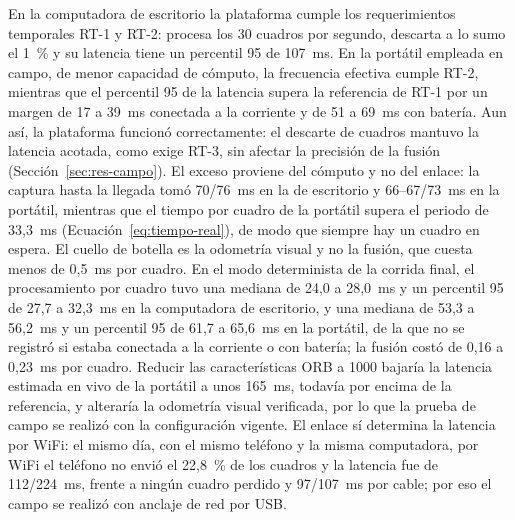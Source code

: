 En la computadora de escritorio la plataforma cumple los requerimientos temporales RT-1 y RT-2: procesa los 30 cuadros por segundo, descarta a lo sumo el 1~\% y su latencia tiene un percentil 95 de 107~ms.
En la portátil empleada en campo, de menor capacidad de cómputo, la frecuencia efectiva cumple RT-2, mientras que el percentil 95 de la latencia supera la referencia de RT-1 por un margen de 17 a 39~ms conectada a la corriente y de 51 a 69~ms con batería.
Aun así, la plataforma funcionó correctamente: el descarte de cuadros mantuvo la latencia acotada, como exige RT-3, sin afectar la precisión de la fusión (Sección~\ref{sec:res-campo}).
El exceso proviene del cómputo y no del enlace: la captura hasta la llegada tomó 70/76~ms en la de escritorio y 66--67/73~ms en la portátil, mientras que el tiempo por cuadro de la portátil supera el periodo de 33,3~ms (Ecuación~\eqref{eq:tiempo-real}), de modo que siempre hay un cuadro en espera.
El cuello de botella es la odometría visual y no la fusión, que cuesta menos de 0,5~ms por cuadro.
En el modo determinista de la corrida final, el procesamiento por cuadro tuvo una mediana de 24,0 a 28,0~ms y un percentil 95 de 27,7 a 32,3~ms en la computadora de escritorio, y una mediana de 53,3 a 56,2~ms y un percentil 95 de 61,7 a 65,6~ms en la portátil, de la que no se registró si estaba conectada a la corriente o con batería; la fusión costó de 0,16 a 0,23~ms por cuadro.
Reducir las características ORB a 1000 bajaría la latencia estimada en vivo de la portátil a unos 165~ms, todavía por encima de la referencia, y alteraría la odometría visual verificada, por lo que la prueba de campo se realizó con la configuración vigente.
El enlace sí determina la latencia por WiFi: el mismo día, con el mismo teléfono y la misma computadora, por WiFi el teléfono no envió el 22,8~\% de los cuadros y la latencia fue de 112/224~ms, frente a ningún cuadro perdido y 97/107~ms por cable; por eso el campo se realizó con anclaje de red por USB.

